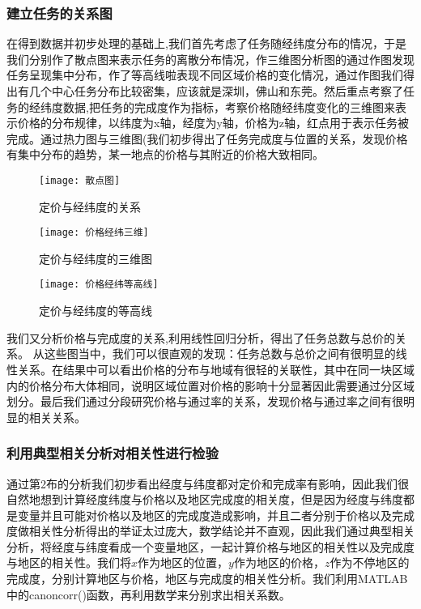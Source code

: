 \documentclass{ctexart}
\begin{document}
\subsubsection{建立任务的关系图}
在得到数据并初步处理的基础上,我们首先考虑了任务随经纬度分布的情况，于是我们分别作了散点图来表示任务的离散分布情况，作三维图分析图的通过作图发现任务呈现集中分布，作了等高线啦表现不同区域价格的变化情况，通过作图我们得出有几个中心任务分布比较密集，应该就是深圳，佛山和东莞。然后重点考察了任务的经纬度数据,把任务的完成度作为指标，考察价格随经纬度变化的三维图来表示价格的分布规律，以纬度为x轴，经度为y轴，价格为z轴，红点用于表示任务被完成。通过热力图与三维图(我们初步得出了任务完成度与位置的关系，发现价格有集中分布的趋势，某一地点的价格与其附近的价格大致相同。
\begin{figure}[htbp] 
\centering
\texttt{[image: 散点图]} 
\caption{定价与经纬度的关系}
\end{figure}
\begin{figure}[htbp] 
\centering
\texttt{[image: 价格经纬三维]} 
\caption{定价与经纬度的三维图}
\end{figure}
\begin{figure}[htbp] 
\centering
\texttt{[image: 价格经纬等高线]} 
\caption{定价与经纬度的等高线}
\end{figure}

我们又分析价格与完成度的关系,利用线性回归分析，得出了任务总数与总价的关系。
从这些图当中，我们可以很直观的发现：任务总数与总价之间有很明显的线性关系。在结果中可以看出价格的分布与地域有很轻的关联性，其中在同一块区域内的价格分布大体相同，说明区域位置对价格的影响十分显著因此需要通过分区域划分。最后我们通过分段研究价格与通过率的关系，发现价格与通过率之间有很明显的相关关系。

\subsubsection{利用典型相关分析对相关性进行检验}
通过第2布的分析我们初步看出经度与纬度都对定价和完成率有影响，因此我们很自然地想到计算经度纬度与价格以及地区完成度的相关度，但是因为经度与纬度都是变量并且可能对价格以及地区的完成度造成影响，并且二者分别于价格以及完成度做相关性分析得出的举证太过庞大，数学结论并不直观，因此我们通过典型相关分析，将经度与纬度看成一个变量地区，一起计算价格与地区的相关性以及完成度与地区的相关性。我们将$x$作为地区的位置，$y$作为地区的价格，$z$作为不停地区的完成度，分别计算地区与价格，地区与完成度的相关性分析。我们利用MATLAB中的canoncorr()函数，再利用数学来分别求出相关系数。
\end{document}
